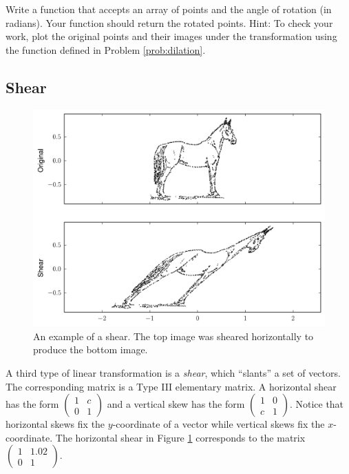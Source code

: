 \begin{problem}
 Write a function that accepts an array of points and the angle of rotation (in radians). Your function should return the rotated points. Hint: To check your work, plot the original points and their images under the transformation using the function  defined in Problem \ref{prob:dilation}.
\end{problem}

\subsection*{Shear}

\begin{figure}
\includegraphics[width=\textwidth]{shear.pdf}
\caption{An example of a shear.
The top image was sheared horizontally to produce the bottom image.}
\label{fig:shear}
\end{figure}

A third type of linear transformation is a \emph{shear}, which ``slants'' a set of vectors. The corresponding matrix is a Type III elementary matrix. A horizontal shear has the form $\begin{pmatrix}
1 & c \\
0 & 1
\end{pmatrix}$ and a vertical skew has the form $
 \begin{pmatrix}
1 & 0 \\
c & 1
\end{pmatrix}
$. Notice that horizontal skews fix the $y$-coordinate of a vector while vertical skews fix the $x$-coordinate. The horizontal shear in Figure \ref{fig:shear} corresponds to the matrix $\begin{pmatrix}
1 & 1.02 \\
0 & 1
\end{pmatrix}
$.


